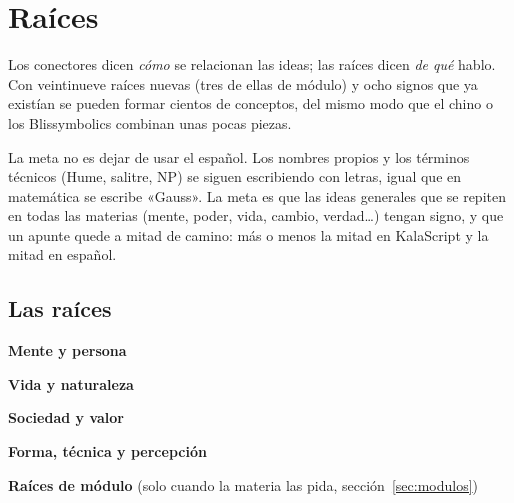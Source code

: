 \section{Raíces}\label{sec:raices}

Los conectores dicen \emph{cómo} se relacionan las ideas; las raíces dicen
\emph{de qué} hablo. Con veintinueve raíces nuevas (tres de ellas de módulo) y ocho signos que ya existían
se pueden formar cientos de conceptos, del mismo modo que el chino o los
Blissymbolics combinan unas pocas piezas.

La meta no es dejar de usar el español. Los nombres propios y los términos
técnicos (Hume, salitre, NP) se siguen escribiendo con letras, igual que en
matemática se escribe «Gauss». La meta es que las ideas generales que se
repiten en todas las materias (mente, poder, vida, cambio, verdad\ldots) tengan
signo, y que un apunte quede a mitad de camino: más o menos la mitad en
KalaScript y la mitad en español.

\subsection{Las raíces}
\textbf{Mente y persona}\par\vspace{1mm}
\textbf{Vida y naturaleza}\par\vspace{1mm}
\textbf{Sociedad y valor}\par\vspace{1mm}
\textbf{Forma, técnica y percepción}\par\vspace{1mm}
\noindent{}\hfill{}\hfill\KalaTarjetaVacia\hfill\KalaTarjetaVacia\par\vspace{3mm}
\textbf{Raíces de módulo} {\small(solo cuando la materia las pida, sección~\ref{sec:modulos})}\par\vspace{1mm}
\noindent{}\hfill{}\hfill{}\hfill\KalaTarjetaVacia\par\vspace{3mm}

